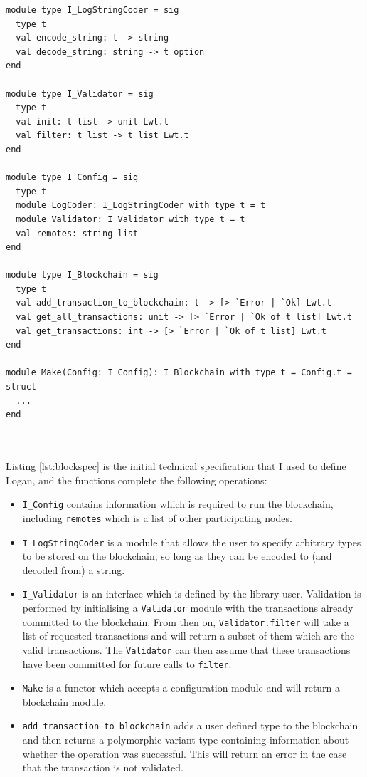 \documentclass[12pt,a4paper,twoside,openright]{report}
\begin{document}
	\begin{minipage}{\linewidth}
	\begin{lstlisting}[caption={Blockchain Specification},label={lst:blockspec}]
module type I_LogStringCoder = sig
  type t
  val encode_string: t -> string
  val decode_string: string -> t option
end

module type I_Validator = sig 
  type t 
  val init: t list -> unit Lwt.t 
  val filter: t list -> t list Lwt.t
end

module type I_Config = sig
  type t
  module LogCoder: I_LogStringCoder with type t = t
  module Validator: I_Validator with type t = t
  val remotes: string list
end

module type I_Blockchain = sig
  type t
  val add_transaction_to_blockchain: t -> [> `Error | `Ok] Lwt.t
  val get_all_transactions: unit -> [> `Error | `Ok of t list] Lwt.t
  val get_transactions: int -> [> `Error | `Ok of t list] Lwt.t
end

module Make(Config: I_Config): I_Blockchain with type t = Config.t = struct 
  ...
end
	\end{lstlisting}
	\end{minipage}\\
	\\
	Listing \ref{lst:blockspec} is the initial technical specification that I used to define Logan, and the functions complete the following operations:
	\begin{itemize}
		\item \texttt{I\_Config} contains information which is required to run the blockchain, including \texttt{remotes} which is a list of other participating nodes.
		\item \texttt{I\_LogStringCoder} is a module that allows the user to specify arbitrary types to be stored on the blockchain, so long as they can be encoded to (and decoded from) a string.
		\item \texttt{I\_Validator} is an interface which is defined by the library user. 
		Validation is performed by initialising a \texttt{Validator} module with the transactions already committed to the blockchain.
		From then on, \texttt{Validator.filter} will take a list of requested transactions and will return a subset of them which are the valid transactions.
		The \texttt{Validator} can then assume that these transactions have been committed for future calls to \texttt{filter}.
		\item \texttt{Make} is a functor which accepts a configuration module and will return a blockchain module.
		\item \texttt{add\_transaction\_to\_blockchain} adds a user defined type to the blockchain and then returns a polymorphic variant type containing information about whether the operation was successful. 
		This will return an error in the case that the transaction is not validated.
	\end{itemize} 
\end{document}
